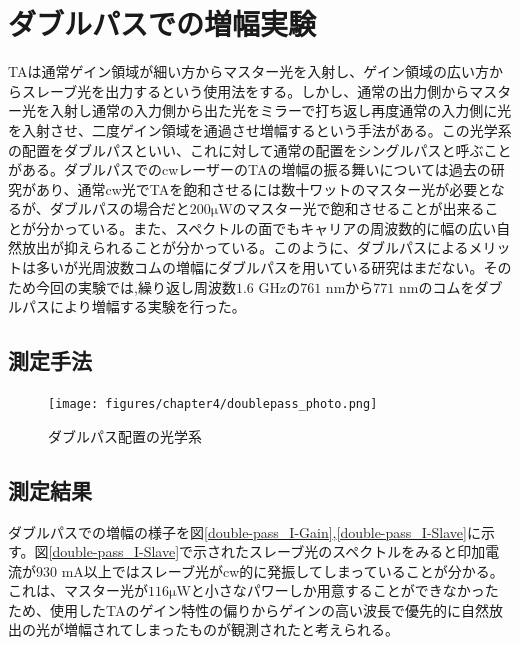 \documentclass[uplatex, dvipdfmx, a4paper, report, papersize, 11pt]{jsbook}
\begin{document}
\section{ダブルパスでの増幅実験}

TAは通常ゲイン領域が細い方からマスター光を入射し、ゲイン領域の広い方からスレーブ光を出力するという使用法をする。しかし、通常の出力側からマスター光を入射し通常の入力側から出た光をミラーで打ち返し再度通常の入力側に光を入射させ、二度ゲイン領域を通過させ増幅するという手法がある。この光学系の配置をダブルパスといい、これに対して通常の配置をシングルパスと呼ぶことがある。ダブルパスでのcwレーザーのTAの増幅の振る舞いについては過去の研究\cite{doi:10.1063/1.3501966}があり、通常cw光でTAを飽和させるには数十ワットのマスター光が必要となるが、ダブルパスの場合だと$200 \mathrm{\mu W}$のマスター光で飽和させることが出来ることが分かっている。また、スペクトルの面でもキャリアの周波数的に幅の広い自然放出が抑えられることが分かっている。このように、ダブルパスによるメリットは多いが光周波数コムの増幅にダブルパスを用いている研究はまだない。そのため今回の実験では,繰り返し周波数$1.6$ GHzの$761$ nmから$771$ nmのコムをダブルパスにより増幅する実験を行った。


\subsection{測定手法}

\begin{figure}[htbp]
 \begin{center}
  \texttt{[image: figures/chapter4/doublepass\_photo.png]}
\end{center}
 \caption{ダブルパス配置の光学系}
 \label{doublepass_photo}
\end{figure}

\subsection{測定結果}
ダブルパスでの増幅の様子を図\ref{double-pass_I-Gain},\ref{double-pass_I-Slave}に示す。図\ref{double-pass_I-Slave}で示されたスレーブ光のスペクトルをみると印加電流が$930$ mA以上ではスレーブ光がcw的に発振してしまっていることが分かる。これは、マスター光が$116 \mathrm{\mu W}$と小さなパワーしか用意することができなかったため、使用したTAのゲイン特性の偏りからゲインの高い波長で優先的に自然放出の光が増幅されてしまったものが観測されたと考えられる。
\end{document}
